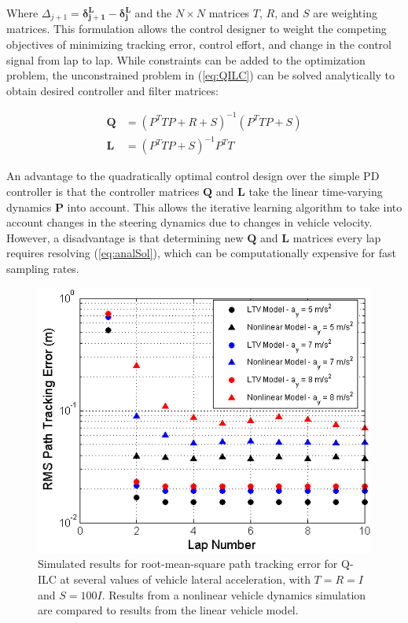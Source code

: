 \documentclass[letterpaper, 10 pt, conference]{ieeeconf}  %
\begin{document}
Where $\Delta_{j\!+\!1} = \mathbf{\delta^L_{j\!+\!1}} - \mathbf{\delta^L_{j}}$ and the $N \times N$ matrices $T$, $R$, and $S$ are weighting matrices.
This formulation allows the control designer to weight the competing objectives of minimizing tracking error, control effort, and change in the control signal from lap to lap.
While constraints can be added to the optimization problem, the unconstrained problem in (\ref{eq:QILC}) can be solved analytically \cite{bristow} to obtain desired controller and filter matrices:

\begin{subequations}
\label{eq:analSol}
\begin{align}
	\mathbf{Q} &= (P^TTP + R + S)^{-1}(P^TTP+S)\\
	\mathbf{L} &= (P^TTP + S)^{-1}P^TT
\end{align}
\end{subequations}

An advantage to the quadratically optimal control design over the simple PD controller is that the controller matrices $\mathbf{Q}$ and $\mathbf{L}$ take the linear time-varying dynamics $\mathbf{P}$ into account. This allows the iterative learning algorithm
to take into account changes in the steering dynamics due to changes in vehicle velocity. However, a disadvantage is that determining new $\mathbf{Q}$ and $\mathbf{L}$ matrices every lap
requires resolving (\ref{eq:analSol}), which can be computationally expensive for fast sampling rates. 

\begin{figure}
\centering
\includegraphics[width=3 in]{figures/QILCsimResults.png}
\caption{Simulated results for root-mean-square path tracking error for Q-ILC at several values of vehicle lateral acceleration, with $T = R = I$ and $S = \mathrm{100} I$. Results from a nonlinear vehicle dynamics simulation are compared to results
from the linear vehicle model.}
\label{fig:QILCsimResults}
\end{figure}
\end{document}
